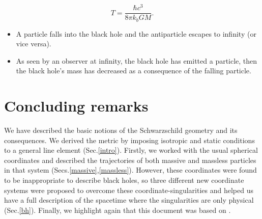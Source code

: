 \documentclass[letterpaper,11pt,onecolumn]{article}
\begin{document}
\begin{equation}
    T=\frac{\hbar c^3}{8\pi k_b G M}.
\end{equation}

\begin{itemize}
    \item A particle falls into the black hole and the antiparticle escapes to infinity (or vice versa).
    \item As seen by an observer at infinity, the black hole has emitted a particle, then the black hole’s mass has decreased as a consequence of the  falling particle.
\end{itemize}


\section{Concluding remarks}

We have described the basic notions of the Schwarzschild geometry and its consequences. We derived the metric by imposing isotropic and static conditions to a general line element (Sec.\ref{intro}). Firstly, we worked with the usual spherical coordinates and described the trajectories of both massive and massless particles in that system (Secs.\ref{massive},\ref{massless}). However, these coordinates were found to be inappropriate to describe black holes, so three different new coordinate systems were proposed to overcome these coordinate-singularities and helped us have a full description of the spacetime where the singularities are only physical (Sec.\ref{bh}). Finally, we highlight again that this document was based on \cite{hobson_efstathiou_lasenby_2006}.


\printbibliography
\end{document}
